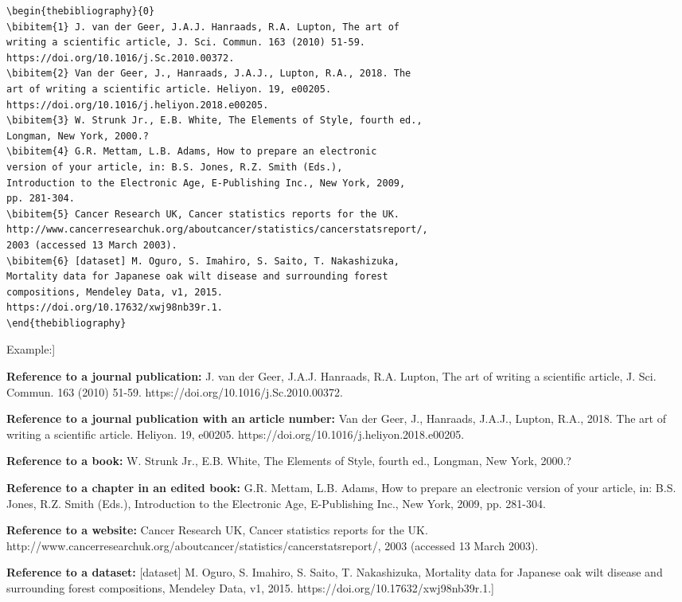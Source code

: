 \documentclass[times,final]{elsarticle}
\begin{document}
{\small
\begin{verbatim}
\begin{thebibliography}{0}
\bibitem{1} J. van der Geer, J.A.J. Hanraads, R.A. Lupton, The art of
writing a scientific article, J. Sci. Commun. 163 (2010) 51-59.
https://doi.org/10.1016/j.Sc.2010.00372.
\bibitem{2} Van der Geer, J., Hanraads, J.A.J., Lupton, R.A., 2018. The
art of writing a scientific article. Heliyon. 19, e00205.
https://doi.org/10.1016/j.heliyon.2018.e00205.
\bibitem{3} W. Strunk Jr., E.B. White, The Elements of Style, fourth ed.,
Longman, New York, 2000.?
\bibitem{4} G.R. Mettam, L.B. Adams, How to prepare an electronic
version of your article, in: B.S. Jones, R.Z. Smith (Eds.),
Introduction to the Electronic Age, E-Publishing Inc., New York, 2009,
pp. 281-304.
\bibitem{5} Cancer Research UK, Cancer statistics reports for the UK.
http://www.cancerresearchuk.org/aboutcancer/statistics/cancerstatsreport/,
2003 (accessed 13 March 2003).
\bibitem{6} [dataset] M. Oguro, S. Imahiro, S. Saito, T. Nakashizuka,
Mortality data for Japanese oak wilt disease and surrounding forest
compositions, Mendeley Data, v1, 2015.
https://doi.org/10.17632/xwj98nb39r.1.
\end{thebibliography}
\end{verbatim}
}

\noindent Example:]
\vspace*{-12pt}

\begin{thebibliography}{0}
\item[] \textbf{Reference to a journal publication:}
 J. van der Geer, J.A.J. Hanraads, R.A. Lupton, The art of
writing a scientific article, J. Sci. Commun. 163 (2010) 51-59.
https://doi.org/10.1016/j.Sc.2010.00372.

\textbf{Reference to a journal publication with an article number:}
 Van der Geer, J., Hanraads, J.A.J., Lupton, R.A., 2018. The
art of writing a scientific article. Heliyon. 19, e00205.
https://doi.org/10.1016/j.heliyon.2018.e00205.

\textbf{Reference to a book:}
 W. Strunk Jr., E.B. White, The Elements of Style, fourth ed., Longman, New York, 2000.?

\textbf{Reference to a chapter in an edited book:}
 G.R. Mettam, L.B. Adams, How to prepare an electronic
version of your article, in: B.S. Jones, R.Z. Smith (Eds.),
Introduction to the Electronic Age, E-Publishing Inc., New York, 2009,
pp. 281-304.

\textbf{Reference to a website:}
 Cancer Research UK, Cancer statistics reports for the UK.\newline
http://www.cancerresearchuk.org/aboutcancer/statistics/cancerstatsreport/, 2003 (accessed 13 March 2003).

\textbf{Reference to a dataset:}
 [dataset] M. Oguro, S. Imahiro, S. Saito, T. Nakashizuka,
Mortality data for Japanese oak wilt disease and surrounding forest
compositions, Mendeley Data, v1, 2015.
https://doi.org/10.17632/xwj98nb39r.1.]
\end{thebibliography}
\end{document}
